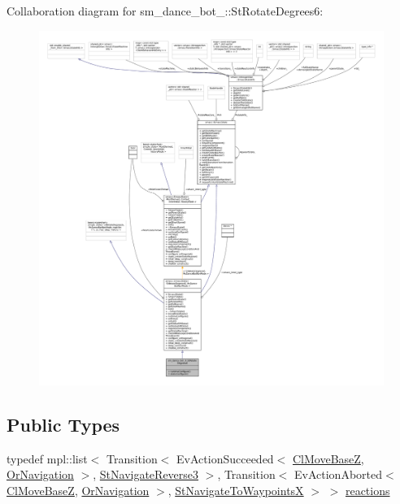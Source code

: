 Collaboration diagram for sm\+\_\+dance\+\_\+bot\+\_\+:\+:St\+Rotate\+Degrees6\+:
\nopagebreak
\begin{figure}[H]
\begin{center}
\leavevmode
\includegraphics[width=350pt]{structsm__dance__bot__3_1_1StRotateDegrees6__coll__graph}
\end{center}
\end{figure}
\subsection*{Public Types}
\begin{DoxyCompactItemize}
\item 
typedef mpl\+::list$<$ Transition$<$ Ev\+Action\+Succeeded$<$ \hyperlink{classmove__base__z__client_1_1ClMoveBaseZ}{Cl\+Move\+BaseZ}, \hyperlink{classsm__dance__bot__3_1_1OrNavigation}{Or\+Navigation} $>$, \hyperlink{structsm__dance__bot__3_1_1StNavigateReverse3}{St\+Navigate\+Reverse3} $>$, Transition$<$ Ev\+Action\+Aborted$<$ \hyperlink{classmove__base__z__client_1_1ClMoveBaseZ}{Cl\+Move\+BaseZ}, \hyperlink{classsm__dance__bot__3_1_1OrNavigation}{Or\+Navigation} $>$, \hyperlink{structsm__dance__bot__3_1_1StNavigateToWaypointsX}{St\+Navigate\+To\+WaypointsX} $>$ $>$ \hyperlink{structsm__dance__bot__3_1_1StRotateDegrees6_adef02f1a6023cb6da55ee18b9e45aa4a}{reactions}
\end{DoxyCompactItemize}
